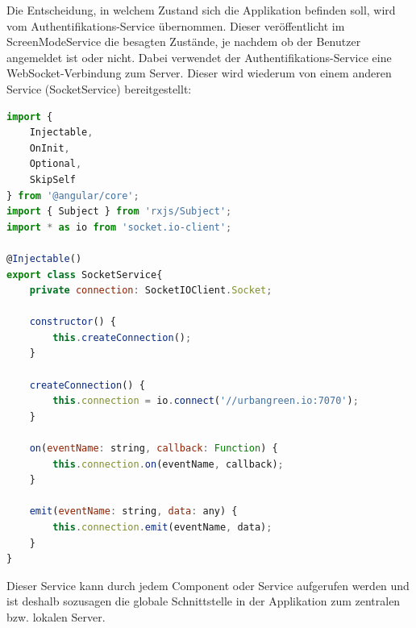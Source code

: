 \clearpage
Die Entscheidung, in welchem Zustand sich die Applikation befinden soll, wird vom Authentifikations-Service übernommen. Dieser veröffentlicht im ScreenModeService die besagten Zustände, je nachdem ob der Benutzer angemeldet ist oder nicht. Dabei verwendet der Authentifikations-Service eine WebSocket-Verbindung zum Server. Dieser wird wiederum von einem anderen Service (SocketService) bereitgestellt:

\lstset{escapechar=?,style=customjava}
\begin{lstlisting}[language=javascript, caption=ScreenModeService ist zuständig für die Webapp-Zustände]
import { 
    Injectable,
    OnInit,
    Optional,
    SkipSelf
} from '@angular/core';
import { Subject } from 'rxjs/Subject';
import * as io from 'socket.io-client';
	
@Injectable()
export class SocketService{
    private connection: SocketIOClient.Socket;

    constructor() {
        this.createConnection();
    }

    createConnection() {
        this.connection = io.connect('//urbangreen.io:7070');
    }

    on(eventName: string, callback: Function) {
        this.connection.on(eventName, callback);
    }

    emit(eventName: string, data: any) {
        this.connection.emit(eventName, data);
    }
}

\end{lstlisting}
\lstset{escapechar=@,style=customjava}
Dieser Service kann durch jedem Component oder Service aufgerufen werden und ist deshalb sozusagen die globale Schnittstelle in der Applikation zum zentralen bzw. lokalen Server.

